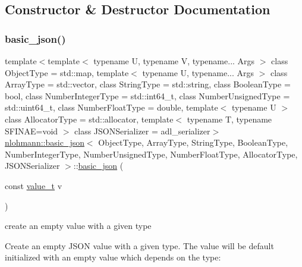 \subsection{Constructor \& Destructor Documentation}
\mbox{\label{classnlohmann_1_1basic__json_aed115142bd0c6c66c864700e0467df55}} 
\subsubsection{\texorpdfstring{basic\+\_\+json()}{basic\_json()}\hspace{0.1cm}{\footnotesize\ttfamily [1/9]}}
{\footnotesize\ttfamily template$<$template$<$ typename U, typename V, typename... Args $>$ class Object\+Type = std\+::map, template$<$ typename U, typename... Args $>$ class Array\+Type = std\+::vector, class String\+Type  = std\+::string, class Boolean\+Type  = bool, class Number\+Integer\+Type  = std\+::int64\+\_\+t, class Number\+Unsigned\+Type  = std\+::uint64\+\_\+t, class Number\+Float\+Type  = double, template$<$ typename U $>$ class Allocator\+Type = std\+::allocator, template$<$ typename T, typename S\+F\+I\+N\+A\+E=void $>$ class J\+S\+O\+N\+Serializer = adl\+\_\+serializer$>$ \\
\mbox{\hyperlink{classnlohmann_1_1basic__json}{nlohmann\+::basic\+\_\+json}}$<$ Object\+Type, Array\+Type, String\+Type, Boolean\+Type, Number\+Integer\+Type, Number\+Unsigned\+Type, Number\+Float\+Type, Allocator\+Type, J\+S\+O\+N\+Serializer $>$\+::\mbox{\hyperlink{classnlohmann_1_1basic__json}{basic\+\_\+json}} (\begin{DoxyParamCaption}\item[{const \mbox{\hyperlink{namespacenlohmann_1_1detail_a1ed8fc6239da25abcaf681d30ace4985}{value\+\_\+t}}}]{v }\end{DoxyParamCaption})\hspace{0.3cm}{\ttfamily [inline]}}



create an empty value with a given type 

Create an empty J\+S\+ON value with a given type. The value will be default initialized with an empty value which depends on the type\+:

